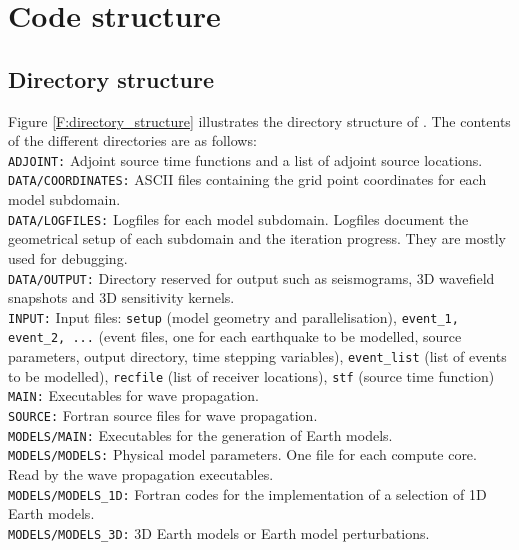 \chapter{Code structure}


\section{Directory structure}

Figure \ref{F:directory_structure} illustrates the directory structure of \SES. The contents of the different directories are as
follows:\\[5pt]
\texttt{ADJOINT:} Adjoint source time functions and a list of adjoint source locations.\\[5pt]
\texttt{DATA/COORDINATES:} ASCII files containing the grid point coordinates for each model subdomain.\\[5pt]
\texttt{DATA/LOGFILES:} Logfiles for each model subdomain. Logfiles document the geometrical setup of each subdomain and the iteration progress. They are mostly used for debugging.\\[5pt]
\texttt{DATA/OUTPUT:} Directory reserved for output such as seismograms, 3D wavefield snapshots and 3D sensitivity kernels.\\[5pt]
\texttt{INPUT:} Input files: \texttt{setup} (model geometry and parallelisation), \texttt{event\_1, event\_2, ...} (event files, one for each earthquake to be modelled, source parameters, output directory, time stepping variables), \texttt{event\_list} (list of events to be modelled), \texttt{recfile} (list of receiver locations), \texttt{stf} (source time function)\\[5pt]
\texttt{MAIN:} Executables for \SES wave propagation.\\[5pt]
\texttt{SOURCE:} Fortran source files for \SES wave propagation.\\[5pt]
\texttt{MODELS/MAIN:} Executables for the generation of Earth models.\\[5pt]
\texttt{MODELS/MODELS:} Physical model parameters. One file for each compute core. Read by the wave propagation executables.\\[5pt]
\texttt{MODELS/MODELS\_1D:} Fortran codes for the implementation of a selection of 1D Earth models.\\[5pt]
\texttt{MODELS/MODELS\_3D:} 3D Earth models or Earth model perturbations.\\[5pt]
